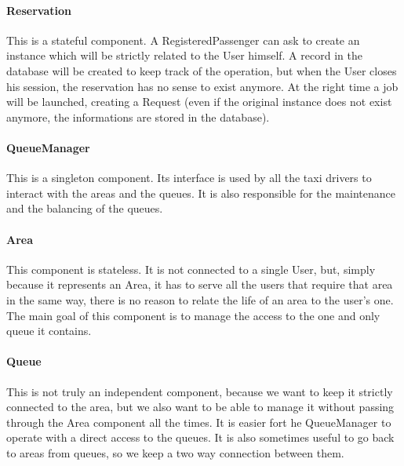 		\paragraph{Reservation}
		This is a stateful component. A RegisteredPassenger can ask to create an instance
		which will be strictly related to the User himself. A record in the database will be created to
		keep track of the operation, but when the User closes his session, the reservation has no sense to exist
		anymore. At the right time a job will be launched, creating a Request (even if the original instance
		does not exist anymore, the informations are stored in the database).
		\paragraph{QueueManager}
		This is a singleton component. Its interface is used by all the taxi drivers to interact with the areas and
		the queues. It is also responsible for the maintenance and the balancing of the queues.
		\paragraph{Area}
		This component is stateless. It is not connected to a single User, but, simply because it represents an Area,
		it has to serve all the users that require that area in the same way, there is no reason to relate the
		life of an area to the user's one. The main goal of this component is to manage the access to the one and
		only queue it contains.
		\paragraph{Queue}
		This is not truly an independent component, because we want to keep it strictly connected to the area,
		but we also want to be able to manage it without passing through the Area component all the times.
		It is easier fort he QueueManager to operate with a direct access to the queues.
		It is also sometimes useful to go back to areas from queues, so we keep a two way connection between them.

